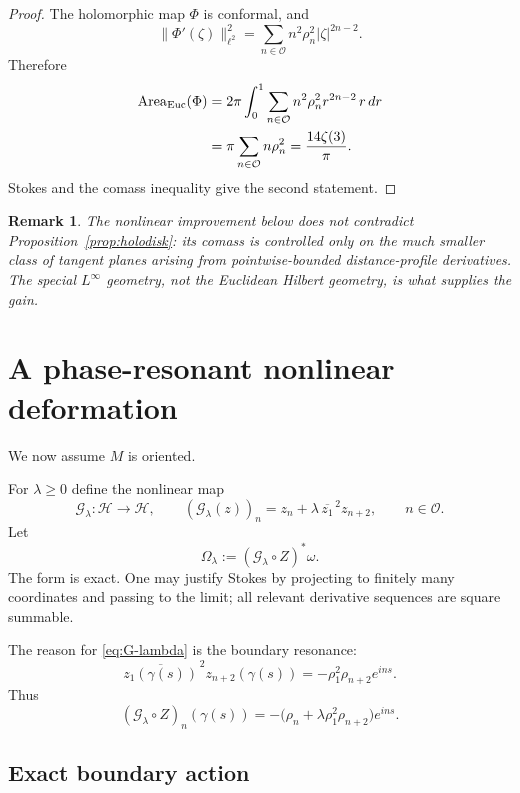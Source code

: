\documentclass[11pt]{article}
\newtheorem{remark}[theorem]{Remark}
\newcommand{\Area}{\operatorname{Area}}
\begin{document}
\begin{proof}
The holomorphic map $\Phi$ is conformal, and
\[
 \|\Phi'(\zeta)\|_{\ell^2}^2
 =
 \sum_{n\in\mathcal O}n^2\rho_n^2|\zeta|^{2n-2}.
\]
Therefore
\[
\begin{aligned}
 \Area_{\rm Euc}(\Phi)
 &=
 2\pi\int_0^1
 \sum_{n\in\mathcal O}n^2\rho_n^2r^{2n-2}\,r\,dr\\
 &=
 \pi\sum_{n\in\mathcal O}n\rho_n^2
 =
 \frac{14\zeta(3)}{\pi}.
\end{aligned}
\]
Stokes and the comass inequality give the second statement.
\end{proof}

\begin{remark}
The nonlinear improvement below does not contradict
Proposition~\ref{prop:holodisk}: its comass is controlled only on the much
smaller class of tangent planes arising from pointwise-bounded
distance-profile derivatives.  The special $L^\infty$ geometry, not the
Euclidean Hilbert geometry, is what supplies the gain.
\end{remark}

\section{A phase-resonant nonlinear deformation}

We now assume $M$ is oriented.

For $\lambda\ge0$ define the nonlinear map
\begin{equation}\label{eq:G-lambda}
 \mathcal G_\lambda:\mathcal H\to\mathcal H,\qquad
 (\mathcal G_\lambda(z))_n
 =
 z_n+\lambda\,\overline{z_1}^{\,2}z_{n+2},
 \qquad n\in\mathcal O.
\end{equation}
Let
\[
        \Omega_\lambda
        :=
        (\mathcal G_\lambda\circ Z)^*\omega.
\]
The form is exact.  One may justify Stokes by projecting to finitely many
coordinates and passing to the limit; all relevant derivative sequences
are square summable.

The reason for \eqref{eq:G-lambda} is the boundary resonance:
\[
 \overline{z_1(\gamma(s))}^{\,2}z_{n+2}(\gamma(s))
 =
 -\rho_1^2\rho_{n+2}e^{ins}.
\]
Thus
\begin{equation}\label{eq:G-boundary}
 (\mathcal G_\lambda\circ Z)_n(\gamma(s))
 =
 -\bigl(\rho_n+\lambda\rho_1^2\rho_{n+2}\bigr)e^{ins}.
\end{equation}

\subsection{Exact boundary action}
\end{document}

